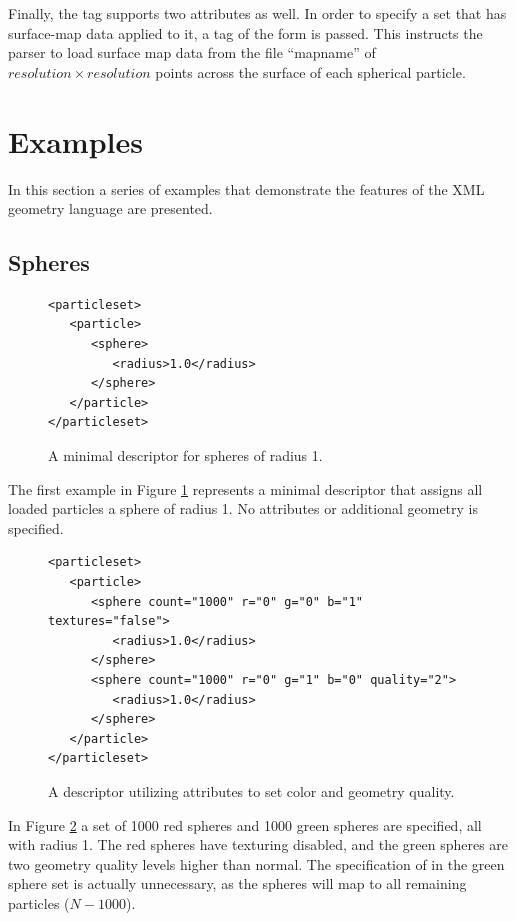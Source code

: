 Finally, the  tag supports two attributes as well.  In order to specify a set that has surface-map data applied to it, a tag of the form  is passed.  This instructs the parser to load surface map data from the file ``mapname'' of $resolution \times resolution$ points across the surface of each spherical particle.

\section{Examples}
In this section a series of examples that demonstrate the features of the XML geometry language are presented.

\subsection{Spheres}
\begin{figure}
\begin{verbatim}
<particleset>
   <particle>
      <sphere>
         <radius>1.0</radius>
      </sphere>
   </particle>
</particleset>
\end{verbatim}
 \caption[A minimal descriptor for spheres of radius 1]{A minimal descriptor for spheres of radius 1.}
 \label{fig:spheres}
\end{figure}
The first example in Figure \ref{fig:spheres} represents a minimal descriptor that assigns all loaded particles a sphere of radius 1.
No attributes or additional geometry is specified.

\begin{figure}
\begin{verbatim}
<particleset>
   <particle>
      <sphere count="1000" r="0" g="0" b="1" textures="false">
         <radius>1.0</radius>
      </sphere>
      <sphere count="1000" r="0" g="1" b="0" quality="2">
         <radius>1.0</radius>
      </sphere>
   </particle>
</particleset>
\end{verbatim}
 \caption[A descriptor utilizing attributes to set color and geometry quality]{A descriptor utilizing attributes to set color and geometry quality.}
 \label{fig:sphereatt}
\end{figure}
In Figure \ref{fig:sphereatt} a set of 1000 red spheres and 1000 green spheres are specified, all with radius 1.
The red spheres have texturing disabled, and the green spheres are two geometry quality levels higher than normal.
The specification of  in the green sphere set is actually unnecessary, as the spheres will map to all remaining particles ($N - 1000$).

